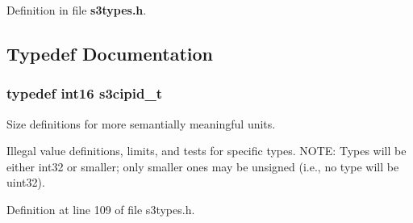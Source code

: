 \-Definition in file {\bf s3types.\-h}.



\subsection{\-Typedef \-Documentation}
\subsubsection[{s3cipid\-\_\-t}]{\setlength{\rightskip}{0pt plus 5cm}typedef {\bf int16} {\bf s3cipid\-\_\-t}}\label{s3types_8h_ae5f70241ce62a79747f0611029a6409d}


\-Size definitions for more semantially meaningful units. 

\-Illegal value definitions, limits, and tests for specific types. \-N\-O\-T\-E\-: \-Types will be either int32 or smaller; only smaller ones may be unsigned (i.\-e., no type will be uint32). 

\-Definition at line 109 of file s3types.\-h.

